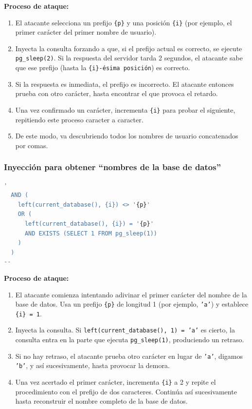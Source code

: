 \documentclass[a4paper,12pt]{article}
\begin{document}
\textbf{Proceso de ataque:}
\begin{enumerate}
    \item El atacante selecciona un prefijo \texttt{\{p\}} y una posición \texttt{\{i\}} (por ejemplo, el primer carácter del primer nombre de usuario).
    \item Inyecta la consulta forzando a que, si el prefijo actual es correcto, se ejecute \texttt{pg\_sleep(2)}. Si la respuesta del servidor tarda 2 segundos, el atacante sabe que ese prefijo (hasta la \texttt{\{i\}-ésima posición}) es correcto.
    \item Si la respuesta es inmediata, el prefijo es incorrecto. El atacante entonces prueba con otro carácter, hasta encontrar el que provoca el retardo.
    \item Una vez confirmado un carácter, incrementa \texttt{\{i\}} para probar el siguiente, repitiendo este proceso caracter a caracter.
    \item De este modo, va descubriendo todos los nombres de usuario concatenados por comas.
\end{enumerate}

\subsubsection*{Inyección para obtener ``nombres de la base de datos''}

\begin{lstlisting}[language=SQL]
'
  AND (
    left(current_database(), {i}) <> '{p}' 
    OR (
      left(current_database(), {i}) = '{p}' 
      AND EXISTS (SELECT 1 FROM pg_sleep(1))
    )
  )
--
\end{lstlisting}

\textbf{Proceso de ataque:}
\begin{enumerate}
    \item El atacante comienza intentando adivinar el primer carácter del nombre de la base de datos. Usa un prefijo \texttt{\{p\}} de longitud 1 (por ejemplo, \texttt{'a'}) y establece \texttt{\{i\} = 1}.
    \item Inyecta la consulta. Si \texttt{left(current\_database(), 1) = 'a'} es cierto, la consulta entra en la parte que ejecuta \texttt{pg\_sleep(1)}, produciendo un retraso.  
    \item Si no hay retraso, el atacante prueba otro carácter en lugar de \texttt{'a'}, digamos \texttt{'b'}, y así sucesivamente, hasta provocar la demora.
    \item Una vez acertado el primer carácter, incrementa \texttt{\{i\}} a 2 y repite el procedimiento con el prefijo de dos caracteres. Continúa así sucesivamente hasta reconstruir el nombre completo de la base de datos.
\end{enumerate}
\end{document}
